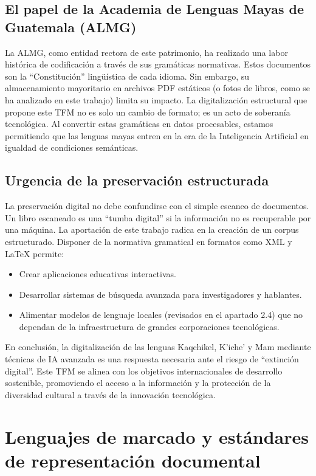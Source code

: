 \subsection{El papel de la Academia de Lenguas Mayas de Guatemala (ALMG)}

La ALMG, como entidad rectora de este patrimonio, ha realizado una labor histórica de codificación a través de sus gramáticas normativas. Estos documentos son la ``Constitución'' lingüística de cada idioma. Sin embargo, su almacenamiento mayoritario en archivos PDF estáticos (o fotos de libros, como se ha analizado en este trabajo) limita su impacto. La digitalización estructural que propone este TFM no es solo un cambio de formato; es un acto de soberanía tecnológica. Al convertir estas gramáticas en datos procesables, estamos permitiendo que las lenguas mayas entren en la era de la Inteligencia Artificial en igualdad de condiciones semánticas.

\subsection{Urgencia de la preservación estructurada}

La preservación digital no debe confundirse con el simple escaneo de documentos. Un libro escaneado es una ``tumba digital'' si la información no es recuperable por una máquina. La aportación de este trabajo radica en la creación de un corpus estructurado. Disponer de la normativa gramatical en formatos como XML y \LaTeX{} permite:

\begin{itemize}
    \item Crear aplicaciones educativas interactivas.
    \item Desarrollar sistemas de búsqueda avanzada para investigadores y hablantes.
    \item Alimentar modelos de lenguaje locales (revisados en el apartado 2.4) que no dependan de la infraestructura de grandes corporaciones tecnológicas.
\end{itemize}

En conclusión, la digitalización de las lenguas Kaqchikel, K'iche' y Mam mediante técnicas de IA avanzada es una respuesta necesaria ante el riesgo de ``extinción digital''. Este TFM se alinea con los objetivos internacionales de desarrollo sostenible, promoviendo el acceso a la información y la protección de la diversidad cultural a través de la innovación tecnológica.


\section{Lenguajes de marcado y estándares de representación documental}


